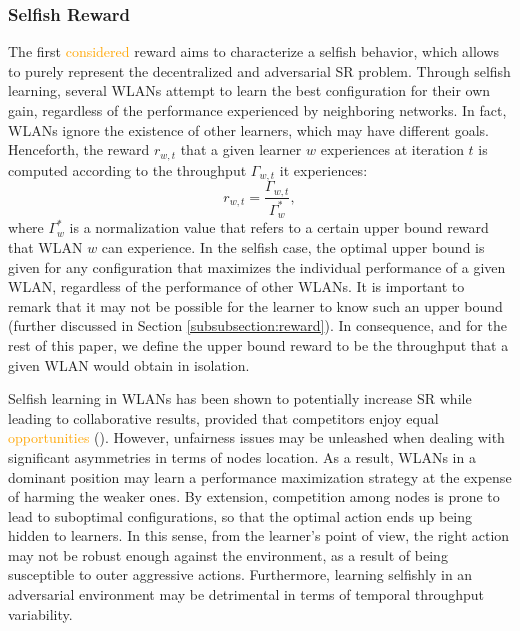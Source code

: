 \documentclass[preprint,12pt]{elsarticle}
\begin{document}
\subsubsection{Selfish Reward}
\label{subsubsection:selfish_learning}
The first \textcolor{orange}{considered} reward aims to characterize a selfish behavior, which allows to purely represent the decentralized and adversarial SR problem. Through selfish learning, several WLANs attempt to learn the best configuration for their own gain, regardless of the performance experienced by neighboring networks. In fact, WLANs ignore the existence of other learners, which may have different goals. Henceforth, the reward $r_{w,t}$ that a given learner $w$ experiences at iteration $t$ is computed according to the throughput $\Gamma_{w,t}$ it experiences: 
\begin{equation}
r_{w,t} = \frac{\Gamma_{w,t}}{\Gamma_w^*}, 
\nonumber
\end{equation}		
where $\Gamma_w^*$ is a normalization value that refers to a certain upper bound reward that WLAN $w$ can experience. In the selfish case, the optimal upper bound is given for any configuration that maximizes the individual performance of a given WLAN, regardless of the performance of other WLANs. It is important to remark that it may not be possible for the learner to know such an upper bound (further discussed in Section \ref{subsubsection:reward}). In consequence, and for the rest of this paper, we define the upper bound reward to be the throughput that a given WLAN would obtain in isolation.

Selfish learning in WLANs has been shown to potentially increase SR while leading to collaborative results, provided that competitors enjoy equal \textcolor{orange}{opportunities} (\citealp{wilhelmi2017collaborative}). However, unfairness issues may be unleashed when dealing with significant asymmetries in terms of nodes location. As a result, WLANs in a dominant position may learn a performance maximization strategy at the expense of harming the weaker ones. By extension, competition among nodes is prone to lead to suboptimal configurations, so that the optimal action ends up being hidden to learners. In this sense, from the learner's point of view, the right action may not be robust enough against the environment, as a result of being susceptible to outer aggressive actions. Furthermore, learning selfishly in an adversarial environment may be detrimental in terms of temporal throughput variability. 

\end{document}
